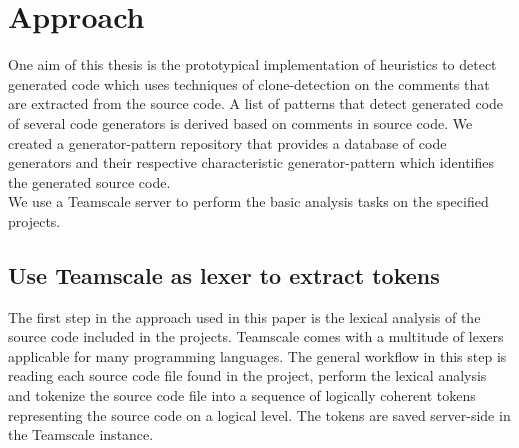 
\chapter{Approach}\label{chapter:approach}
One aim of this thesis is the prototypical implementation of heuristics to detect generated code which uses techniques of clone-detection on the comments that are extracted from the source code. A list of patterns that detect generated code of several code generators is derived based on comments in source code. We created a generator-pattern repository that provides a database of code generators and their respective characteristic generator-pattern which identifies the generated source code.\\
We use a Teamscale server to perform the basic analysis tasks on the specified projects.
\section{Use Teamscale as lexer to extract tokens}
The first step in the approach used in this paper is the lexical analysis of the source code included in the projects. Teamscale comes with a multitude of lexers applicable for many programming languages. The general workflow in this step is reading each source code file found in the project, perform the lexical analysis and tokenize the source code file into a sequence of logically coherent tokens representing the source code on a logical level. The tokens are saved server-side in the Teamscale instance.


